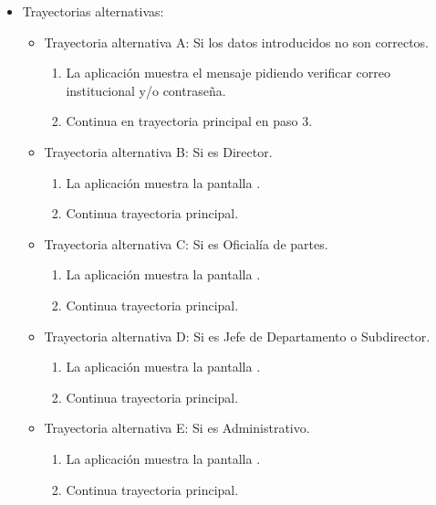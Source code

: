 \begin{itemize}
\begin{enumerate}
		\end{enumerate}
	\item Trayectorias alternativas:
		\begin{itemize}
			\item Trayectoria alternativa A: Si los datos introducidos no son correctos.
				\begin{enumerate}
					\item La aplicación muestra el mensaje  pidiendo verificar correo institucional y/o contraseña.
					\item Continua en trayectoria principal en paso 3.
				\end{enumerate}
			\item Trayectoria alternativa B: Si es Director.
				\begin{enumerate}
					\item La aplicación muestra la pantalla .
					\item Continua trayectoria principal.
				\end{enumerate}
			\item Trayectoria alternativa C: Si es Oficialía de partes.
				\begin{enumerate}
					\item La aplicación muestra la pantalla .
					\item Continua trayectoria principal.
				\end{enumerate}
			\item Trayectoria alternativa D: Si es Jefe de Departamento o Subdirector.
				\begin{enumerate}
					\item La aplicación muestra la pantalla .
					\item Continua trayectoria principal.
				\end{enumerate}
			\item Trayectoria alternativa E: Si es Administrativo.
				\begin{enumerate}
					\item La aplicación muestra la pantalla .
					\item Continua trayectoria principal.
				\end{enumerate}
		\end{itemize}
\end{itemize}

